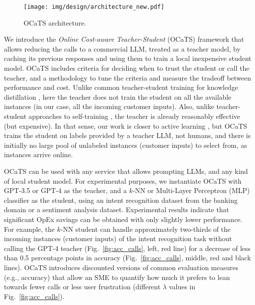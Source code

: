 \documentclass[11pt]{article}
\begin{document}
\begin{figure}[!tbp]
    \centering
    \texttt{[image: img/design/architecture\_new.pdf]}
    \caption{OCaTS architecture.}
    \label{fig:architecture}
    \vspace*{-4mm}
\end{figure}

We introduce the \emph{Online Cost-aware Teacher-Student} (OCaTS) framework that allows reducing the calls to a commercial LLM, treated as a teacher model, by caching its previous responses and using them to train a local inexpensive student model. OCaTS includes criteria for deciding when to trust the student or call the teacher, and a methodology to tune the criteria and measure the tradeoff between performance and cost. Unlike common teacher-student training for knowledge distillation \cite{DistillationHinton,10.1007/s11263-021-01453-z}, here the teacher does not train the student on all the available instances (in our case, all the incoming customer inputs). Also, unlike teacher-student approaches to self-training \cite{SelfTrainingForDialogues,SelfTrainingAndPreTrainingComplementary}, the teacher is already reasonably effective (but expensive). In that sense, our work is closer to active learning \cite{ActiveLearningBook,HumanInTheLoopBook}, but OCaTS trains the student on labels provided by a teacher LLM, not humans, and there is initially no large pool of unlabeled instances (customer inputs) to select from, as instances arrive online. 

OCaTS can be used with any service that allows prompting LLMs, and any kind of local student model. For experimental purposes, we instantiate OCaTS with GPT-3.5 or GPT-4 as the teacher, and a $k$-NN or Multi-Layer Perceptron (MLP) classifier as the student, using an intent recognition dataset from the banking domain or a sentiment analysis dataset. Experimental results indicate that significant OpEx savings can be obtained with only slightly lower performance. For example, the $k$-NN student can handle approximately two-thirds of the incoming instances (customer inputs) of the intent recognition task without calling the GPT-4 teacher (Fig.~\ref{fig:acc_calls}, left, red line) for a decrease of less than 0.5 percentage points in accuracy (Fig.~\ref{fig:acc_calls}, middle, red and black lines). OCaTS introduces discounted versions of common evaluation measures (e.g., accuracy) that allow an SME to quantify how much it prefers to lean towards fewer calls or less user frustration (different $\lambda$ values in Fig.~\ref{fig:acc_calls}).
\end{document}
